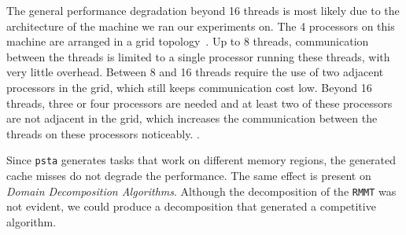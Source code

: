 The general performance degradation beyond 16 threads is most likely
due to the architecture of the machine we ran our experiments on.  The
4 processors on this machine are arranged in a grid
topology~\cite{Drepper2007}.  Up to 8 threads, communication between
the threads is limited to a single processor running these threads,
with very little overhead.  Between 8 and 16 threads require the use
of two adjacent processors in the grid, which still keeps
communication cost low.  Beyond 16 threads, three or four processors
are needed and at least two of these processors are not adjacent in
the grid, which increases the communication between the threads on
these processors noticeably.  .

Since {\tt psta} generates tasks that work on different memory
regions, the generated cache misses  do
not degrade the performance. The same effect is present on
\emph{Domain Decomposition Algorithms}. Although the decomposition of
the {\tt RMMT} was not evident, we could produce a decomposition that
generated a competitive algorithm.
%	

